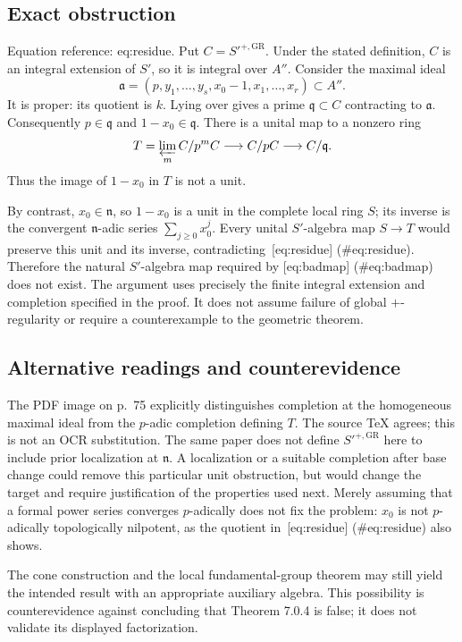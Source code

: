 \documentclass[10pt]{article}
\begin{document}
\subsection*{Exact obstruction}
Equation reference: eq:residue. Put \(C=S'^{+,\mathrm{GR}}\). Under the stated definition, \(C\) is an integral extension of \(S'\), so it is integral over \(A''\). Consider the maximal ideal \[\mathfrak a=(p,y_1,\ldots,y_s,x_0-1,x_1,\ldots,x_r)
 \subset A'' .\] It is proper: its quotient is \(k\). Lying over gives a prime \(\mathfrak q\subset C\) contracting to \(\mathfrak a\). Consequently \(p\in\mathfrak q\) and \(1-x_0\in\mathfrak q\). There is a unital map to a nonzero ring \[
 T=\varprojlim_m C/p^mC\longrightarrow C/pC
 \longrightarrow C/\mathfrak q .\] Thus the image of \(1-x_0\) in \(T\) is not a unit.\par
By contrast, \(x_0\in\mathfrak n\), so \(1-x_0\) is a unit in the complete local ring \(S\); its inverse is the convergent \(\mathfrak n\)-adic series \(\sum_{j\geq0}x_0^j\). Every unital \(S'\)-algebra map \(S\to T\) would preserve this unit and its inverse, contradicting [eq:residue] (\#eq:residue). Therefore the natural \(S'\)-algebra map required by [eq:badmap] (\#eq:badmap) does not exist. The argument uses precisely the finite integral extension and completion specified in the proof. It does not assume failure of global \(+\)-regularity or require a counterexample to the geometric theorem.\par
\subsection*{Alternative readings and counterevidence}
The PDF image on p. 75 explicitly distinguishes completion at the homogeneous maximal ideal from the \(p\)-adic completion defining \(T\). The source TeX agrees; this is not an OCR substitution. The same paper does not define \(S'^{+,\mathrm{GR}}\) here to include prior localization at \(\mathfrak n\). A localization or a suitable completion after base change could remove this particular unit obstruction, but would change the target and require justification of the properties used next. Merely assuming that a formal power series converges \(p\)-adically does not fix the problem: \(x_0\) is not \(p\)-adically topologically nilpotent, as the quotient in [eq:residue] (\#eq:residue) also shows.\par
The cone construction and the local fundamental-group theorem may still yield the intended result with an appropriate auxiliary algebra. This possibility is counterevidence against concluding that Theorem 7.0.4 is false; it does not validate its displayed factorization.\par
\end{document}
